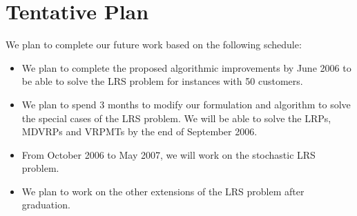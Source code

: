   
\section{Tentative Plan}
We plan to complete our future work based on the following schedule:

\begin{itemize}
\item We plan to complete the proposed algorithmic improvements by June 2006 to be able to solve
the LRS problem for instances with 50 customers.
\item We plan to spend 3 months to modify our formulation and algorithm to solve the special cases of the
LRS problem. We will be able to solve the LRPs, MDVRPs and VRPMTs by the end of September 2006. 
\item From October 2006 to May 2007, we will work on the stochastic LRS problem. 
\item We plan to work on the other extensions of the LRS problem after graduation. 
\end{itemize}    
